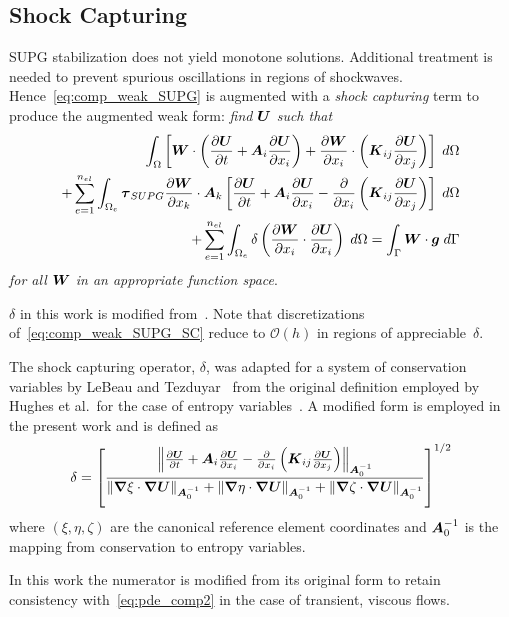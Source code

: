 \documentclass[compress,11pt]{beamer}
\begin{document}
\subsection{Shock Capturing}
\frame
{
  \small
  SUPG stabilization does not yield monotone solutions.  Additional treatment is needed to prevent spurious oscillations in regions of shockwaves.  Hence~\eqref{eq:comp_weak_SUPG} is augmented with a \emph{shock capturing} term to produce the augmented weak form: \emph{find ${\boldsymbol{U}}$ such that}
  \begin{eqnarray}
  \label{eq:comp_weak_SUPG_SC}
  \int_\Omega  \left[ {\boldsymbol{W}}\cdot\left({\frac{\partial{{\boldsymbol{U}}}}{\partial{t}}} + {\boldsymbol{A}}_i {\frac{\partial{{\boldsymbol{U}}}}{\partial{x_i}}} \right) + {\frac{\partial{{\boldsymbol{W}}}}{\partial{x_i}}} \cdot \left( {\boldsymbol{K}}_{ij} {\frac{\partial{{\boldsymbol{U}}}}{\partial{x_j}}} \right) \right] \; d\Omega \nonumber \\
  + \sum_{e=1}^{n_{el}} \int_{\Omega_e} {\boldsymbol{\tau}}_{SUPG} {\frac{\partial{{\boldsymbol{W}}}}{\partial{x_k}}}\cdot{\boldsymbol{A}}_k
  \left[ {\frac{\partial{{\boldsymbol{U}}}}{\partial{t}}} + {\boldsymbol{A}}_i {\frac{\partial{{\boldsymbol{U}}}}{\partial{x_i}}} - {\frac{\partial{}}{\partial{x_i}}} \left( {\boldsymbol{K}}_{ij} {\frac{\partial{{\boldsymbol{U}}}}{\partial{x_j}}} \right) \right] \; d\Omega  \nonumber \\
  + \sum_{e=1}^{n_{el}} \int_{\Omega_e} \delta \left({\frac{\partial{{\boldsymbol{W}}}}{\partial{x_i}}}\cdot{\frac{\partial{{\boldsymbol{U}}}}{\partial{x_i}}}\right)\; d\Omega
   = \int_\Gamma {\boldsymbol{W}}\cdot{\boldsymbol{g}} \; d\Gamma
\end{eqnarray}
  \emph{for all ${\boldsymbol{W}}$ in an appropriate function space}.
  \vspace{.5em}
  
  $\delta$ in this work is modified from~\cite{gjlebeau_thesis,skaliabadi_dissertation}.  Note that discretizations of~\eqref{eq:comp_weak_SUPG_SC} reduce to $\mathcal{O}(h)$ in regions of appreciable~$\delta$.
  \normalsize  
}

\frame
{
  \small
  The shock capturing operator, $\delta$, was adapted for a system of conservation variables by LeBeau and Tezduyar~\cite{gjlebeau_thesis,skaliabadi_dissertation,aliabadi_tezduyar_IJNMF_1995} from the original definition employed by Hughes et al.\ for the case of entropy variables~\cite{hughes_shock_capturing,shakib_hughes_ns}.  A modified form is employed in the present work and is defined as
\begin{equation}
  \label{eq:shock_capturing_parameter}
  \delta = \left[\frac{\left\|{\frac{\partial{{\boldsymbol{U}}}}{\partial{t}}} + {\boldsymbol{A}}_i{\frac{\partial{{\boldsymbol{U}}}}{\partial{x_i}}}
                       - {\frac{\partial{}}{\partial{x_i}}} \left( {\boldsymbol{K}}_{ij} {\frac{\partial{{\boldsymbol{U}}}}{\partial{x_j}}} \right)\right\|_{{\boldsymbol{A}}_0^{-1}}}
                      {\|{\boldsymbol{\nabla}} {\xi}  \cdot{\boldsymbol{\nabla}} {{\boldsymbol{U}}}\|_{{\boldsymbol{A}}_0^{-1}} +
		       \|{\boldsymbol{\nabla}} {\eta} \cdot{\boldsymbol{\nabla}} {{\boldsymbol{U}}}\|_{{\boldsymbol{A}}_0^{-1}} +
		       \|{\boldsymbol{\nabla}} {\zeta}\cdot{\boldsymbol{\nabla}} {{\boldsymbol{U}}}\|_{{\boldsymbol{A}}_0^{-1}}}\right]^{1/2}
\end{equation}
where $\left(\xi,\eta,\zeta\right)$ are the canonical reference element coordinates and ${\boldsymbol{A}}_0^{-1}$ is the mapping from conservation to entropy variables.
\vspace{.5em}

In this work the numerator is modified from its original form to retain consistency with~\eqref{eq:pde_comp2} in the case of transient, viscous flows.
}
\end{document}
